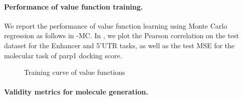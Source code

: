 \paragraph{Performance of value function training.} 

We report the performance of value function learning using Monte Carlo regression as follows in \alg-MC. In , we plot the Pearson correlation on the test dataset for the Enhancer and 5'UTR tasks, as well as the test MSE for the molecular task of parp1 docking score.



\begin{figure}[!ht]
    \centering
    \caption{Training curve of value functions}
    \label{fig:training_curve}
\end{figure}


\paragraph{Validity metrics for molecule generation.} 



